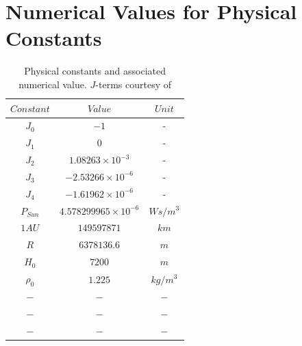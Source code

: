 \section*{Numerical Values for Physical Constants}
\begin{table}[h!]
\centering
\begin{tabular}{c c c}
\hline
$Constant$ & $Value$ & $Unit$ \\
\hline
$J_0$ & $-1$ & -\\
$J_1$ & $0$ & -\\
$J_2$ & $1.08263 \times 10^{-3}$  & -\\
$J_3$ & $-2.53266 \times 10^{-6}$ & -\\
$J_4$ & $-1.61962 \times 10^{-6}$ & -\\
$P_{Sun}$ & $4.578299965 \times 10^{-6}$ & $Ws/m^3$ \\
$1AU$ & $149597871$ & $km$ \\
$R$ & $6378136.6$ & $m$ \\
$H_0$ & $7200$ & $m$ \\
$\rho_0$ & $1.225$ & $kg/m^3$ \\
$-$ & $-$ & $-$ \\
$-$ & $-$ & $-$ \\
$-$ & $-$ & $-$ \\
\hline
\end{tabular}
\caption{Physical constants and associated numerical value. $J$-terms courtesy of}
\label{tab:phys_const}
\end{table}






